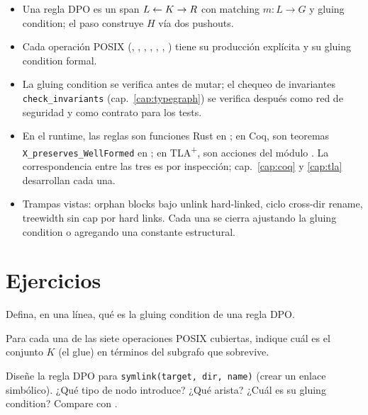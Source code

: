 \begin{itemize}
  \item Una regla DPO es un span $L \leftarrow K \rightarrow R$ con matching $m: L \to
    G$ y gluing condition; el paso construye $H$ vía dos pushouts.
  \item Cada operación POSIX (\opcreate, \opmkdir, \oplink, \opunlink,
    \oprmdir, \oprename, \opwrite) tiene su producción explícita y
    su gluing condition formal.
  \item La gluing condition se verifica antes de mutar; el chequeo de
    invariantes \texttt{check\_invariants} (cap.~\ref{cap:typegraph})
    se verifica después como red de seguridad y como contrato para los
    tests.
  \item En el runtime, las reglas son funciones Rust en
    ; en Coq, son teoremas
    \texttt{X\_preserves\_WellFormed} en ; en
    TLA\textsuperscript{+}, son acciones del módulo
    . La correspondencia entre las tres es por
    inspección; cap.~\ref{cap:coq} y \ref{cap:tla} desarrollan cada
    una.
  \item Trampas vistas: orphan blocks bajo unlink hard-linked, ciclo
    cross-dir rename, treewidth sin cap por hard links. Cada una se
    cierra ajustando la gluing condition o agregando una constante
    estructural.
\end{itemize}

\section*{Ejercicios}

\begin{ejercicio}[\dificultad{$\star$}]
\label{ej:dpo-1}
Defina, en una línea, qué es la gluing condition de una regla DPO.
\end{ejercicio}

\begin{ejercicio}[\dificultad{$\star$}]
\label{ej:dpo-2}
Para cada una de las siete operaciones POSIX cubiertas, indique cuál es
el conjunto $K$ (el glue) en términos del subgrafo que sobrevive.
\end{ejercicio}

\begin{ejercicio}[\dificultad{$\star\star$}]
\label{ej:dpo-3}
Diseñe la regla DPO para \texttt{symlink(target, dir, name)} (crear un
enlace simbólico). ¿Qué tipo de nodo introduce? ¿Qué arista? ¿Cuál es
su gluing condition? Compare con \opcreate.
\end{ejercicio}

